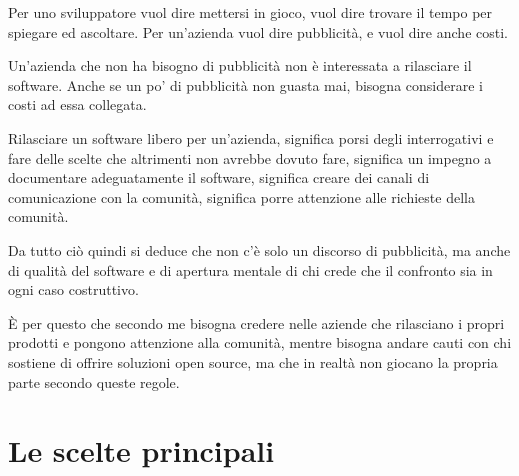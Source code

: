 \documentclass[a4wide,10pt,italian]{manual}
\begin{document}
Per uno sviluppatore vuol dire mettersi in gioco, vuol dire trovare il tempo per spiegare
ed ascoltare. Per un'azienda vuol dire pubblicità, e vuol dire anche costi.

Un'azienda che non ha bisogno di pubblicità non è interessata a rilasciare il software.
Anche se un po' di pubblicità non guasta mai, bisogna considerare i costi ad essa collegata.

Rilasciare un software libero per un'azienda, significa porsi degli interrogativi e fare
delle scelte che altrimenti non avrebbe dovuto fare, significa un impegno a documentare adeguatamente
il software, significa creare dei canali di comunicazione con la comunità, significa
porre attenzione alle richieste della comunità.

Da tutto ciò quindi si deduce che non c'è solo un discorso di pubblicità, ma anche di qualità
del software e di apertura mentale di chi crede che il confronto sia in ogni caso costruttivo.

È per questo che secondo me bisogna credere nelle aziende che rilasciano i
propri prodotti e pongono attenzione alla comunità, mentre bisogna andare cauti con chi sostiene di
offrire soluzioni open source, ma che in realtà non giocano la propria parte secondo queste regole.


\section{Le scelte principali}
\end{document}
